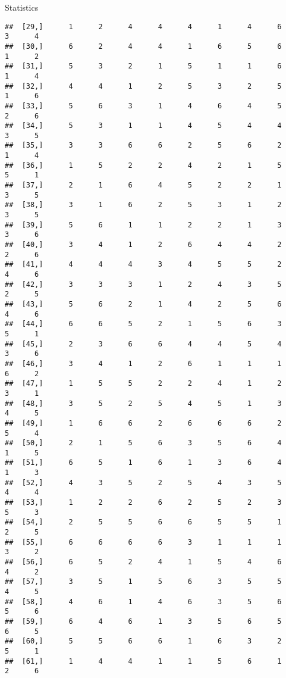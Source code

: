 \documentclass[
  ignorenonframetext,
]{beamer}
\begin{document}
\begin{frame}[fragile]{Statistics}
\begin{verbatim}
##  [29,]      1      2      4      4      4      1      4      6      3      4
##  [30,]      6      2      4      4      1      6      5      6      1      2
##  [31,]      5      3      2      1      5      1      1      6      1      4
##  [32,]      4      4      1      2      5      3      2      5      1      6
##  [33,]      5      6      3      1      4      6      4      5      2      6
##  [34,]      5      3      1      1      4      5      4      4      3      5
##  [35,]      3      3      6      6      2      5      6      2      1      4
##  [36,]      1      5      2      2      4      2      1      5      5      1
##  [37,]      2      1      6      4      5      2      2      1      3      5
##  [38,]      3      1      6      2      5      3      1      2      3      5
##  [39,]      5      6      1      1      2      2      1      3      3      6
##  [40,]      3      4      1      2      6      4      4      2      2      6
##  [41,]      4      4      4      3      4      5      5      2      4      6
##  [42,]      3      3      3      1      2      4      3      5      2      5
##  [43,]      5      6      2      1      4      2      5      6      4      6
##  [44,]      6      6      5      2      1      5      6      3      5      1
##  [45,]      2      3      6      6      4      4      5      4      3      6
##  [46,]      3      4      1      2      6      1      1      1      6      2
##  [47,]      1      5      5      2      2      4      1      2      3      1
##  [48,]      3      5      2      5      4      5      1      3      4      5
##  [49,]      1      6      6      2      6      6      6      2      5      4
##  [50,]      2      1      5      6      3      5      6      4      1      5
##  [51,]      6      5      1      6      1      3      6      4      1      3
##  [52,]      4      3      5      2      5      4      3      5      4      4
##  [53,]      1      2      2      6      2      5      2      3      5      3
##  [54,]      2      5      5      6      6      5      5      1      2      5
##  [55,]      6      6      6      6      3      1      1      1      3      2
##  [56,]      6      5      2      4      1      5      4      6      4      2
##  [57,]      3      5      1      5      6      3      5      5      4      5
##  [58,]      4      6      1      4      6      3      5      6      5      6
##  [59,]      6      4      6      1      3      5      6      5      6      5
##  [60,]      5      5      6      6      1      6      3      2      5      1
##  [61,]      1      4      4      1      1      5      6      1      2      6

\end{verbatim}
\end{frame}
\end{document}
